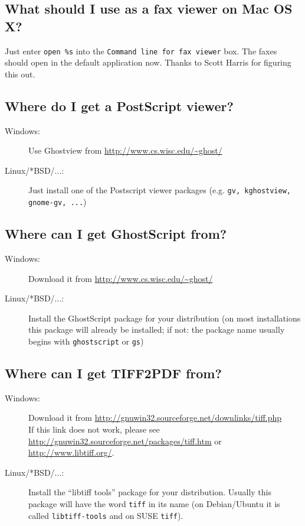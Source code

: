 \documentclass[a4paper,10pt]{scrartcl}
\begin{document}
\subsection{What should I use as a fax viewer on Mac OS X?}
Just enter \verb.open %s. into the \texttt{Command line for fax viewer} box.
The faxes should open in the default application now.
Thanks to Scott Harris for figuring this out.


\subsection{Where do I get a PostScript viewer?}
\begin{description}
\item[Windows:] Use Ghostview from \url{http://www.cs.wisc.edu/~ghost/}
\item[Linux/*BSD/...:] Just install one of the Postscript viewer packages
                (e.g. \texttt{gv, kghostview, gnome-gv, ...})
\end{description}

\subsection{Where can I get GhostScript from?}
\begin{description}
\item[Windows:] Download it from \url{http://www.cs.wisc.edu/~ghost/}
\item[Linux/*BSD/...:] Install the GhostScript package for your distribution (on most installations this package will already be installed; if not: the package name usually begins with \texttt{ghostscript} or \texttt{gs})
\end{description}

\subsection{Where can I get TIFF2PDF from?}
\begin{description}
\item[Windows:] Download it from \url{http://gnuwin32.sourceforge.net/downlinks/tiff.php}\\ If this link does not work, please see \url{http://gnuwin32.sourceforge.net/packages/tiff.htm} or \url{http://www.libtiff.org/}.
\item[Linux/*BSD/...:] Install the ``libtiff tools'' package for your distribution. Usually this package will have the word \texttt{tiff} in its name (on Debian/Ubuntu it is called \texttt{libtiff-tools} and on SUSE \texttt{tiff}).
\end{description}
\end{document}
